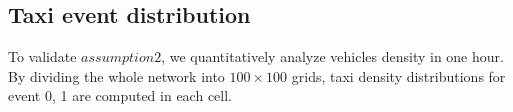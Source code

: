 \subsection{Taxi event distribution}
\label{section_taxi_denstiy_distribution}

To validate $assumption 2$, we quantitatively analyze vehicles density in one hour. By dividing the whole network into $100 \times 100$ grids, taxi density distributions for event 0, 1 are computed in each cell.


